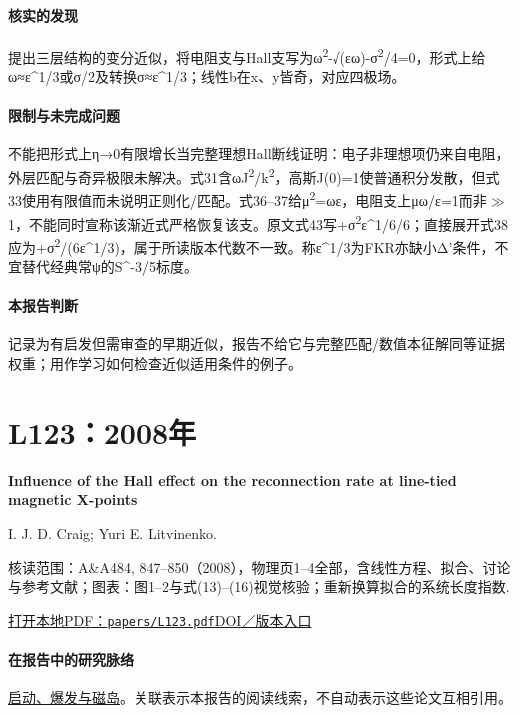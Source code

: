 \paragraph{核实的发现}提出三层结构的变分近似，将电阻支与Hall支写为ω\textsuperscript{2}-√(εω)-σ\textsuperscript{2}/4=0，形式上给ω≈ε\textasciicircum{}1/3或σ/2及转换σ≈ε\textasciicircum{}1/3；线性b在x、y皆奇，对应四极场。

\paragraph{限制与未完成问题}不能把形式上η→0有限增长当完整理想Hall断线证明：电子非理想项仍来自电阻，外层匹配与奇异极限未解决。式31含ωJ\textsuperscript{2}/k\textsuperscript{2}，高斯J(0)=1使普通积分发散，但式33使用有限值而未说明正则化/匹配。式36–37给μ\textsuperscript{2}=ωε，电阻支上μω/ε=1而非\ensuremath{\gg}1，不能同时宣称该渐近式严格恢复该支。原文式43写+σ\textsuperscript{2}ε\textasciicircum{}1/6/6；直接展开式38应为+σ\textsuperscript{2}/(6ε\textasciicircum{}1/3)，属于所读版本代数不一致。称ε\textasciicircum{}1/3为FKR亦缺小Δ'条件，不宜替代经典常ψ的S\textasciicircum{}-3/5标度。

\paragraph{本报告判断}记录为有启发但需审查的早期近似，报告不给它与完整匹配/数值本征解同等证据权重；用作学习如何检查近似适用条件的例子。

\section{L123：2008年}\label{paper:L123}

\textbf{Influence of the Hall effect on the reconnection rate at line-tied magnetic X-points}\citep{L123}\

I. J. D. Craig;  Yuri E. Litvinenko.

\textsf{核读范围：}A\&A484, 847–850（2008），物理页1–4全部，含线性方程、拟合、讨论与参考文献；\textsf{图表：}图1–2与式(13)–(16)视觉核验；重新换算拟合的系统长度指数.

\href{run:papers/L123.pdf}{打开本地PDF：\texttt{papers/L123.pdf}}\quad\href{https://doi.org/10.1051/0004-6361:200809569}{DOI／版本入口}

\paragraph{在报告中的研究脉络}\hyperref[story:onset]{启动、爆发与磁岛}。关联表示本报告的阅读线索，不自动表示这些论文互相引用。

